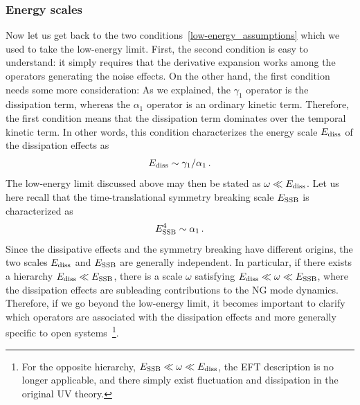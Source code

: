 \documentclass[a4paper,11pt]{article}
\begin{document}
\subsubsection{Energy scales}

Now let us get back to the two conditions~\eqref{low-energy_assumptions} 
which we used to take the low-energy limit. 
First, the second condition is easy to understand: 
it simply requires that the derivative expansion works among the operators generating the noise effects. On the other hand, the first condition needs some more consideration: As we explained, the $\gamma_1$ operator is the dissipation term, whereas the $\alpha_1$ operator is an ordinary kinetic term. Therefore, the first condition means that the dissipation term dominates over the temporal kinetic term. In other words, this condition characterizes the energy scale $E_{\rm diss}$ of the dissipation effects as
\begin{align}
E_{\rm diss}\sim\gamma_1/\alpha_1\,.
\end{align}
The low-energy limit discussed above may then be stated as $\omega\ll E_{\rm diss}$. Let us here recall that the time-translational symmetry breaking scale $E_{\rm SSB}$ is characterized as
\begin{align}
E_{\rm SSB}^4\sim \alpha_1\,.
\end{align}
Since the dissipative effects and the symmetry breaking have different origins, the two scales $E_{\rm diss}$ and $E_{\rm SSB}$ are generally independent. In particular, if there exists a hierarchy $E_{\rm diss}\ll E_{\rm SSB}$, there is a scale $\omega$ satisfying $E_{\rm diss}\ll \omega\ll E_{\rm SSB}$, where the dissipation effects are subleading contributions to the NG mode dynamics. Therefore, if we go beyond the low-energy limit, it becomes important to clarify which operators are associated with the dissipation effects and more generally specific to open systems~\footnote{For the opposite hierarchy, $E_{\rm SSB}\ll \omega\ll E_{\rm diss}$, the EFT description is no longer applicable, and there simply exist fluctuation and dissipation in the original UV theory.}.
\end{document}

